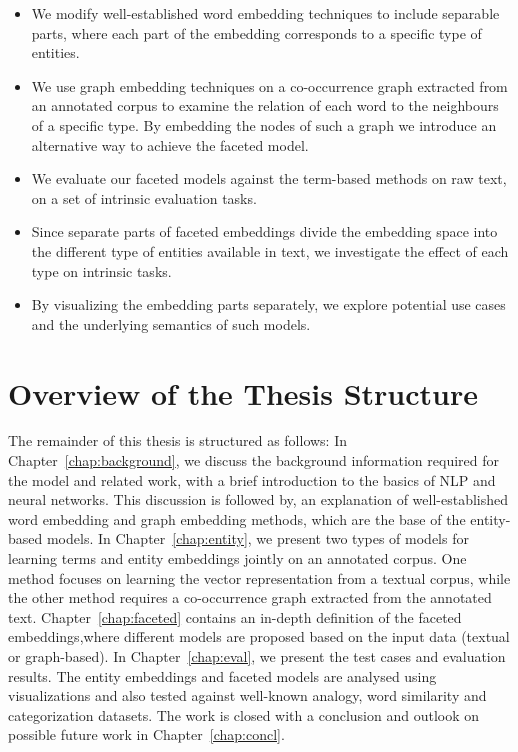\begin{itemize}
\item We modify well-established word embedding techniques to include separable parts, where each part of the embedding corresponds to a specific type of entities. 
\item We use graph embedding techniques on a co-occurrence graph extracted from an annotated corpus to examine the relation of each word to the neighbours of a specific type. By embedding the nodes of such a graph we introduce an alternative way to achieve the faceted model.
\item We evaluate our faceted models against the term-based methods on raw text, on a set of intrinsic evaluation tasks. 
\item Since separate parts of faceted embeddings divide the embedding space into the different type of entities available in text, we investigate the effect of each type on intrinsic tasks. 
\item By visualizing the embedding parts separately, we explore potential use cases and the underlying semantics of such models.   
\end{itemize}



\section{Overview of the Thesis Structure}
The remainder of this thesis is structured as follows: 
In Chapter~\ref{chap:background},  we discuss the background information required for the model and related work, with a brief introduction to the basics of NLP and neural networks. This discussion is followed by, an explanation of well-established word embedding and graph embedding methods, which are the base of the entity-based models. In Chapter~\ref{chap:entity}, we present two types of models for learning terms and entity embeddings jointly on an annotated corpus. One method focuses on learning the vector representation from a textual corpus, while the other method requires a co-occurrence graph extracted from the annotated text.
Chapter~\ref{chap:faceted} contains an in-depth definition of the faceted embeddings,where different models are proposed based on the input data (textual or graph-based). 
In Chapter~\ref{chap:eval}, we present the test cases and evaluation results. The entity embeddings and faceted models are analysed using visualizations and also tested against well-known analogy, word similarity and categorization datasets. The work is closed with a conclusion and outlook on possible future work in Chapter~\ref{chap:concl}. 


